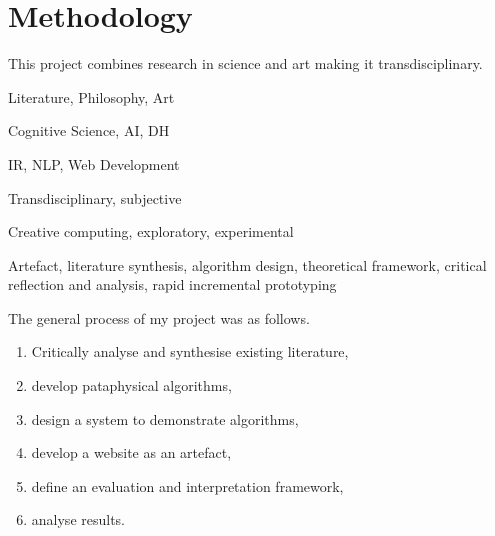 \section{Methodology}
\label{s:intromethod}

This project combines research in science and art making it transdisciplinary.

\begin{description}[leftmargin=3cm]
  \item [Pataphysics] Literature, Philosophy, Art
  \item [Creativity] Cognitive Science, \ac{AI}, \ac{DH}
  \item [Technology] \ac{IR}, \ac{NLP}, Web Development
\end{description}


\begin{description}[leftmargin=3cm]
  \item [Epistemology] Transdisciplinary, subjective
  \item [Methodology] Creative computing, exploratory, experimental
  \item [Methods] Artefact, literature synthesis, algorithm design, theoretical framework, critical reflection and analysis, rapid incremental prototyping
\end{description}

The general process of my project was as follows.

\begin{enumerate}
  \item Critically analyse and synthesise existing literature,\sidepar{\textspiral~\ref{p:lit}}
  \item develop pataphysical algorithms,\sidepar{\textspiral~\ref{p:practice}}
  \item design a system to demonstrate algorithms,\sidepar{\textspiral~\ref{p:practice}}
  \item develop a website as an artefact,\sidepar{\textspiral~\ref{p:practice}}
  \item define an evaluation and interpretation framework,\sidepar{\textspiral~\ref{p:theory}}
  \item analyse results.\sidepar{\textspiral~\ref{p:analysis}}
\end{enumerate}


